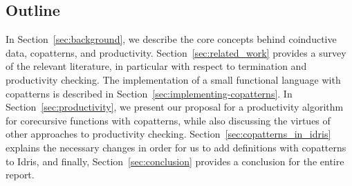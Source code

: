 \subsection{Outline}
In Section~\ref{sec:background}, we describe the core concepts behind coinductive data, copatterns, and productivity. Section~\ref{sec:related_work} provides a survey of the relevant literature, in particular with respect to termination and productivity checking. The implementation of a small functional language with copatterns is described in Section~\ref{sec:implementing-copatterns}. In Section~\ref{sec:productivity}, we present our proposal for a productivity algorithm for corecursive functions with copatterns, while also discussing the virtues of other approaches to productivity checking. Section~\ref{sec:copatterns_in_idris} explains the necessary changes in order for us to add definitions with copatterns to Idris, and finally, Section~\ref{sec:conclusion} provides a conclusion for the entire report.
